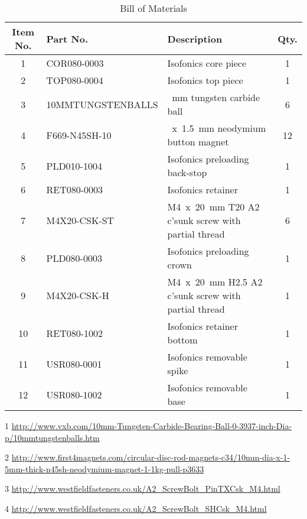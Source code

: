 \documentclass[11pt]{article}
\begin{document}
\begin{table}[h]
    \centering
    \footnotesize
    \begin{threeparttable}
        \caption{Bill of Materials}
        \label{table:bom}
        \begin{tabular}{@{}clp{17em}c@{}}
            \toprule
            Item No. & Part No. & Description & Qty. \\
            \midrule
            1 & COR080-0003 & \raggedright Isofonics core piece & 1 \\
            2 & TOP080-0004 & \raggedright Isofonics top piece & 1 \\
            3 & 10MMTUNGSTENBALLS\tnote{1} & \raggedright \diameter 10~mm 
            tungsten carbide ball & 6 \\
            4 & F669-N45SH-10\tnote{2} & \raggedright \diameter 10~x~1.5~mm 
            neodymium 
            button magnet & 12 \\
            5 & PLD010-1004 & \raggedright Isofonics preloading back-stop & 1 \\
            6 & RET080-0003 & \raggedright Isofonics retainer & 1 \\
            7 & M4X20-CSK-ST\tnote{3} & \raggedright M4~x~20~mm T20 A2 c'sunk 
            screw with partial thread & 6 \\
            8 & PLD080-0003 & \raggedright Isofonics preloading crown & 1 \\
            9 & M4X20-CSK-H\tnote{4} & \raggedright M4~x~20~mm H2.5 A2 c'sunk 
            screw with partial thread & 1 \\
            10 & RET080-1002 & \raggedright Isofonics retainer bottom & 1 \\
            11 & USR080-0001 & \raggedright Isofonics removable spike & 1 \\
            12 & USR080-1002 & \raggedright Isofonics removable base & 1 \\
            \bottomrule
        \end{tabular}
        \begin{tablenotes}
            \raggedright
            \tiny
            \item[1]\url{http://www.vxb.com/10mm-Tungsten-Carbide-Bearing-Ball-0-3937-inch-Dia-p/10mmtungstenballs.htm}
            \item[2]\url{http://www.first4magnets.com/circular-disc-rod-magnets-c34/10mm-dia-x-1-5mm-thick-n45sh-neodymium-magnet-1-1kg-pull-p3633}
            \item[3]\url{http://www.westfieldfasteners.co.uk/A2_ScrewBolt_PinTXCsk_M4.html}
            \item[4]\url{http://www.westfieldfasteners.co.uk/A2_ScrewBolt_SHCsk_M4.html}
        \end{tablenotes}
    \end{threeparttable}
\end{table}
\end{document}
